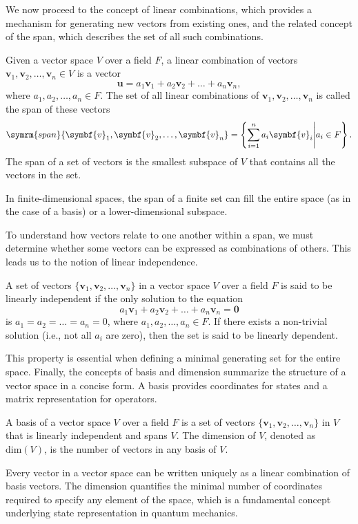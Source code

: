 We now proceed to the concept of linear combinations, which provides a mechanism for generating new vectors from existing ones, and the related concept of the span, which describes the set of all such combinations.
\begin{definition}
Given a vector space $V$ over a field $F$, a linear combination of vectors $\symbf{v}_1,\symbf{v}_2,\ldots,\symbf{v}_n\in V$ is a vector
\begin{equation}
\symbf{u}=a_1\symbf{v}_1+a_2\symbf{v}_2+\ldots+a_n\symbf{v}_n,
\end{equation}
where $a_1,a_2,\ldots,a_n\in F$. The set of all linear combinations of ${\symbf{v}_1,\symbf{v}_2,\ldots,\symbf{v}_n}$ is called the span of these vectors
\begin{equation}
\symrm{span}\lbrace\symbf{v}_1,\symbf{v}_2,\ldots,\symbf{v}_n\rbrace=\left\lbrace\sum_{i=1}^n a_i\symbf{v}_i\middle\vert a_i\in F\right\rbrace.
\end{equation}
The span of a set of vectors is the smallest subspace of $V$ that contains all the vectors in the set.
\end{definition}
In finite-dimensional spaces, the span of a finite set can fill the entire space (as in the case of a basis) or a lower-dimensional subspace.

To understand how vectors relate to one another within a span, we must determine whether some vectors can be expressed as combinations of others. This leads us to the notion of linear independence.
\begin{definition}
A set of vectors $\lbrace\symbf{v}_1,\symbf{v}_2,\ldots,\symbf{v}_n\rbrace$ in a vector space $V$ over a field $F$ is said to be linearly independent if the only solution to the equation
\begin{equation}
a_1\symbf{v}_1+a_2\symbf{v}_2+\ldots+a_n\symbf{v}_n=\symbf{0}
\end{equation}
is $a_1=a_2=\ldots=a_n=0$, where $a_1,a_2,\ldots,a_n\in F$. If there exists a non-trivial solution (i.e., not all $a_i$ are zero), then the set is said to be linearly dependent.
\end{definition}
This property is essential when defining a minimal generating set for the entire space. Finally, the concepts of basis and dimension summarize the structure of a vector space in a concise form. A basis provides coordinates for states and a matrix representation for operators.
\begin{definition}[Basis]
A basis of a vector space $V$ over a field $F$ is a set of vectors $\lbrace\symbf{v}_1,\symbf{v}_2,\ldots,\symbf{v}_n\rbrace$ in $V$ that is linearly independent and spans $V$. The dimension of $V$, denoted as $\text{dim}(V)$, is the number of vectors in any basis of $V$.
\end{definition}
Every vector in a vector space can be written uniquely as a linear combination of basis vectors. The dimension quantifies the minimal number of coordinates required to specify any element of the space, which is a fundamental concept underlying state representation in quantum mechanics.
